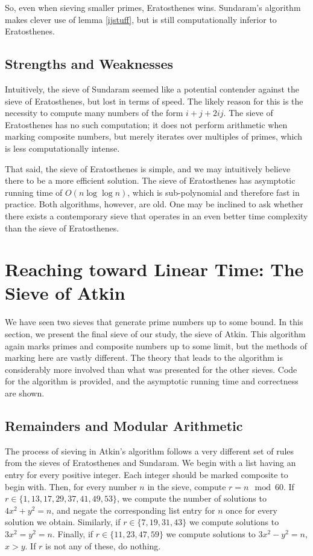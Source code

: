 \documentclass{amsart}
\theoremstyle{definition}
\theoremstyle{case}
\begin{document}
	So, even when sieving smaller primes, Eratosthenes wins. Sundaram's algorithm makes clever use of lemma \ref{ijstuff}, but is still computationally inferior to Eratosthenes.
	
	\subsection{Strengths and Weaknesses}
	Intuitively, the sieve of Sundaram seemed like a potential contender against the sieve of Eratosthenes, but lost in terms of speed. The likely reason for this is the necessity to compute many numbers of the form $i+j+2ij$. The sieve of Eratosthenes has no such computation; it does not perform arithmetic when marking composite numbers, but merely iterates over multiples of primes, which is less computationally intense.
	
	That said, the sieve of Eratosthenes is simple, and we may intuitively believe there to be a more efficient solution. The sieve of Eratosthenes has asymptotic running time of $O(n \log \log n)$, which is sub-polynomial and therefore fast in practice. Both algorithms, however, are old. One may be inclined to ask whether there exists a contemporary sieve that operates in an even better time complexity than the sieve of Eratosthenes.

	\section{Reaching toward Linear Time: The Sieve of Atkin}
	
	We have seen two sieves that generate prime numbers up to some bound. In this section, we present the final sieve of our study, the sieve of Atkin. This algorithm again marks primes and composite numbers up to some limit, but the methods of marking here are vastly different. The theory that leads to the algorithm is considerably more involved than what was presented for the other sieves. Code for the algorithm is provided, and the asymptotic running time and correctness are shown.
	
	\subsection{Remainders and Modular Arithmetic}
	
	The process of sieving in Atkin's algorithm follows a very different set of rules from the sieves of Eratosthenes and Sundaram. We begin with a list having an entry for every positive integer. Each integer should be marked composite to begin with. Then, for every number $n$ in the sieve, compute $r = n \mod 60$. If $r \in \{1, 13, 17, 29, 37, 41, 49, 53\}$, we compute the number of solutions to $4x^2 + y^2 = n$, and negate the corresponding list entry for $n$ once for every solution we obtain. Similarly, if $r \in \{7, 19, 31, 43\}$ we compute solutions to $3x^2 = y^2 = n$. Finally, if $r \in \{11, 23, 47, 59\}$ we compute solutions to $3x^2 - y^2 = n$, $x>y$. If $r$ is not any of these, do nothing.
	
\end{document}
